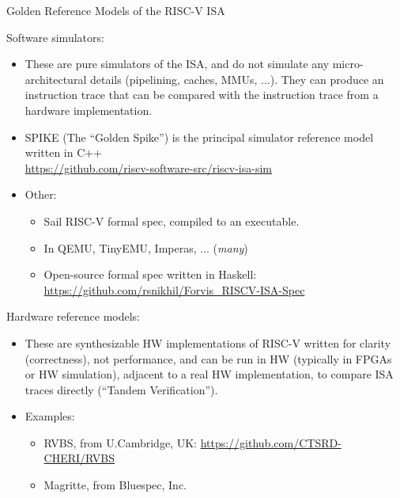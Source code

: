 \documentclass{article}
\begin{document}
\clearpage


\begin{center}
  {\Huge
    Golden Reference Models of the RISC-V ISA}

  \vspace*{0.5in}

  \begin{minipage}{9in}\LARGE
    Software simulators:
    \begin{itemize}\Large

    \item These are pure simulators of the ISA, and do not simulate
      any micro-architectural details (pipelining, caches, MMUs, ...).
      They can produce an instruction trace that can be compared with
      the instruction trace from a hardware implementation.

    \item SPIKE (The ``Golden Spike'') is the principal simulator reference model written in C++ \\
      \url{https://github.com/riscv-software-src/riscv-isa-sim}\\

    \item Other:
      \begin{itemize}
      \item Sail RISC-V formal spec, compiled to an executable.
      \item In QEMU, TinyEMU, Imperas, ... (\emph{many})
      \item Open-source formal spec written in Haskell:
        \url{https://github.com/rsnikhil/Forvis_RISCV-ISA-Spec}
      \end{itemize}
    \end{itemize}

    \vspace{2ex}

    Hardware reference models:
    \begin{itemize}\Large

    \item These are synthesizable HW implementations of RISC-V written
      for clarity (correctness), not performance, and can be run in HW
      (typically in FPGAs or HW simulation), adjacent to a real HW
      implementation, to compare ISA traces directly (``Tandem
      Verification'').

    \item Examples:
      \begin{itemize}
      \item RVBS, from U.Cambridge, UK: \url{https://github.com/CTSRD-CHERI/RVBS}
      \item Magritte, from Bluespec, Inc.
      \end{itemize}
    \end{itemize}

  \end{minipage}
\end{center}
\end{document}
